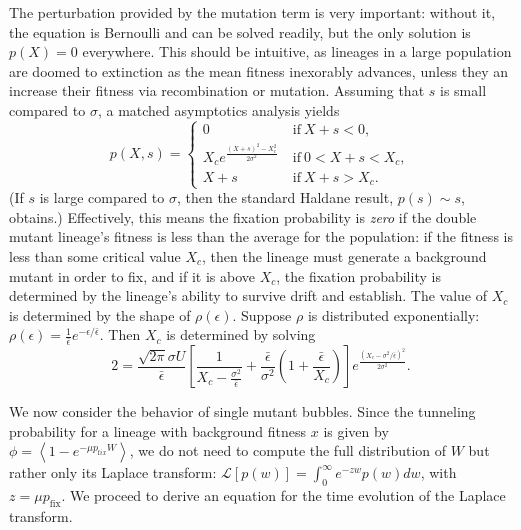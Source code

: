 \documentclass[rmp]{revtex4}
\begin{document}
The perturbation provided by the mutation term is very important: without it, the equation is Bernoulli and can be solved readily, but the only solution is $p(X) = 0$ everywhere.
This should be intuitive, as lineages in a large population are doomed to extinction as the mean fitness inexorably advances, unless they an increase their fitness via recombination or mutation.
Assuming that $s$ is small compared to $\sigma$, a matched asymptotics analysis yields
\begin{equation}
p(X,s) =
\begin{cases}
0 &\mathrm{~if~} X+s < 0, \\
X_c e^{\frac{(X+s)^2-X_c^2}{2\sigma^2}} &\mathrm{~if~} 0 < X+s < X_c, \\
X+s &\mathrm{~if~} X+s > X_c.
\end{cases}
\end{equation}
(If $s$ is large compared to $\sigma$, then the standard Haldane result, $p(s) \sim s$, obtains.)
Effectively, this means the fixation probability is \emph{zero} if the double mutant lineage's fitness is less than the average for the population: if the fitness is less than some critical value $X_c$, then the lineage must generate a background mutant in order to fix, and if it is above $X_c$, the fixation probability is determined by the lineage's ability to survive drift and establish.
The value of $X_c$ is determined by the shape of $\rho(\epsilon)$.
Suppose $\rho$ is distributed exponentially: $\rho(\epsilon) = \frac{1}{\bar{\epsilon}} e^{-\epsilon/\bar{\epsilon}}$.
Then $X_c$ is determined by solving
\begin{equation}
2 = \frac{\sqrt{2\pi}\sigma U}{\bar{\epsilon}} \left[ \frac{1}{X_c - \frac{\sigma^2}{\bar{\epsilon}}} + \frac{\bar{\epsilon}}{\sigma^2} \left( 1+ \frac{\bar{\epsilon}}{X_c} \right) \right] e^{\frac{(X_c - \sigma^2/\bar{\epsilon})^2}{2\sigma^2}}. 
\end{equation}

We now consider the behavior of single mutant bubbles.
Since the tunneling probability for a lineage with background fitness $x$ is given by $\phi = \left< 1 - e^{-\mu p_{\mathrm fix} W} \right>$, we do not need to compute the full distribution of $W$ but rather only its Laplace transform: $\mathcal{L}\left[ p(w) \right] = \int_0^\infty e^{-zw} p(w) dw$, with $z = \mu p_{\mathrm {fix}}$.
We proceed to derive an equation for the time evolution of the Laplace transform.
\end{document}
